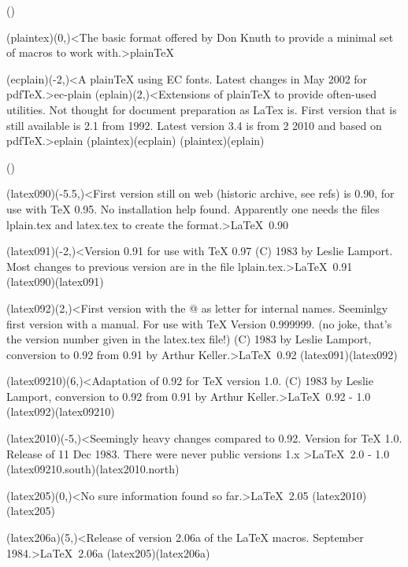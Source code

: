 \clearpage

\tograph(){
	\tonode(plaintex)(0,\layer)<The basic format offered by Don Knuth to provide a minimal set of macros to work with.>{plain\TeX}
\steplayer[-2]

	\tonode(ecplain)(-2,\layer)<A plainTeX using EC fonts. Latest changes in May 2002 for pdfTeX.>{ec-plain}
	\tonode(eplain)(2,\layer)<Extensions of plainTeX to provide often-used utilities. Not thought for document preparation as LaTex is. First version that is still available is 2.1 from 1992. Latest version 3.4 is from 2 2010 and based on pdfTeX.>{eplain}
	\todraw(plaintex)(ecplain)
	\todraw(plaintex)(eplain)
}
\clearpage

\tograph*(){

	\tonode(latex090)(-5.5,\layer)<First version still on web (historic archive, see refs) is 0.90, for use with TeX 0.95. No installation help found. Apparently one needs the files lplain.tex and latex.tex to create the format.>{\LaTeX\ 0.90}
	
	\tonode(latex091)(-2,\layer)<Version 0.91 for use with TeX 0.97 (C) 1983 by Leslie Lamport. Most changes to previous version are in the file lplain.tex.>{\LaTeX\ 0.91}
	\todraw(latex090)(latex091)
	
	\tonode(latex092)(2,\layer)<First version with the @ as letter for internal names. Seeminlgy first version with a manual. For use with TeX Version 0.999999. (no joke, that's the version number given in the latex.tex file!) (C) 1983 by Leslie Lamport, conversion to 0.92 from 0.91 by Arthur Keller.>{\LaTeX\ 0.92}
	\todraw(latex091)(latex092)

	\tonode(latex09210)(6,\layer)<Adaptation of 0.92 for TeX version 1.0. (C) 1983 by Leslie Lamport, conversion to 0.92 from 0.91 by Arthur Keller.>{\LaTeX\ 0.92 - 1.0}
	\todraw(latex092)(latex09210)
	\steplayer[-2.3]

	\tonode(latex2010)(-5,\layer)<Seemingly heavy changes compared to 0.92. Version for TeX 1.0. Release of 11 Dec 1983. There were never public versions 1.x >{\LaTeX\ 2.0 - 1.0}
	\todraw(latex09210.south)(latex2010.north)
	
	\tonode(latex205)(0,\layer)<No sure information found so far.>{\LaTeX\ 2.05}
	\todraw(latex2010)(latex205)
	
	\tonode(latex206a)(5,\layer)<Release of version 2.06a of the LaTeX macros. September 1984.>{\LaTeX\ 2.06a}
	\todraw(latex205)(latex206a)
	
}
